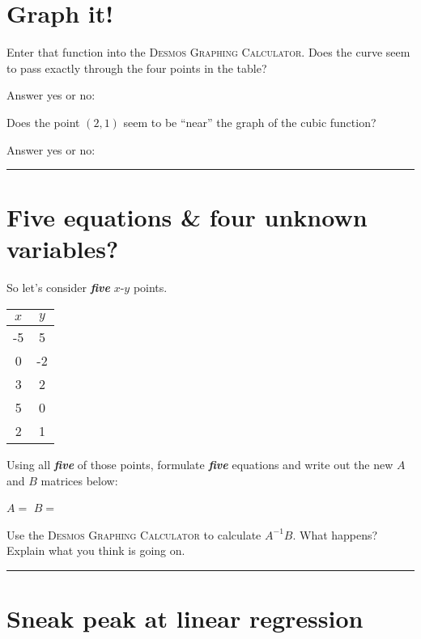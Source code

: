 \documentclass[10pt,letterpaper]{memoir}
\begin{document}
\section*{Graph it!}
Enter that function into the {\scshape Desmos Graphing Calculator}.
Does the curve seem to pass exactly through the four points in the table?

Answer yes or no: \gap{\hspace{3em}}

Does the point $(2,1)$ seem to be ``near'' the graph of the cubic function?

Answer yes or no: \gap{\hspace{3em}}\vspace{1em}
\hrule





\section*{Five equations \& four unknown variables?} 
So let's consider {\bfseries\itshape five} $x$-$y$ points.
\begin{center}\begin{tabular}{cc}
    \toprule
    $x$ & $y$ \\
    \midrule
    -5 & 5 \\
    0 & -2 \\
    3 & 2 \\
    5 & 0 \\
    2 & 1 \\
    \bottomrule
\end{tabular}\end{center}

Using all {\bfseries\itshape five} of those points,
formulate {\bfseries\itshape five} equations 
and write out the new $A$ and $B$ matrices below:
\par
{\Large
    \vspace{3em}
    \hfill $A = $\hspace{1.5in} \hfill $B = $\hspace{1.5in} \hfill
    \vspace{3em}
}

Use the {\scshape Desmos Graphing Calculator}
to calculate $A^{-1}B$. 
What happens? Explain what you think is going on.
\vspace{2.5in}
\hrule


\section*{Sneak peak at linear regression}
\end{document}
